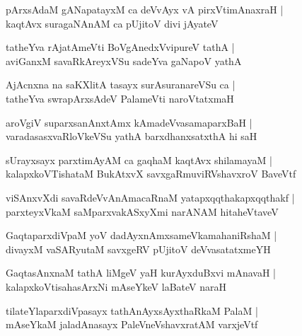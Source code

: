 \documentclass[twoside,12pt,openright]{book}
\newcounter{shloka}[chapter]
\begin{document}
\begin{shloka}%
pArxsAdaM gANapatayxM ca deVvAyx vA pirxVtimAnaxraH |\\
kaqtAvx suragaNAnAM ca pUjitoV divi jAyateV 
\end{shloka}

\begin{shloka}%
tatheYva rAjatAmeVti BoVgAnedxVvipureV tathA |\\
aviGanxM savaRkAreyxVSu sadeYva gaNapoV yathA
\end{shloka}

\begin{shloka}%
AjAcnxna na saKXlitA tasayx surAsuranareVSu ca |\\
tatheYva swrapArxsAdeV PalameVti naroVtatxmaH 
\end{shloka}

\begin{shloka}%
aroVgiV suparxsanAnxtAmx kAmadeVvasamaparxBaH |\\
varadasasxvaRloVkeVSu yathA barxdhanxsatxthA hi saH 
\end{shloka}

\begin{shloka}%
sUrayxsayx parxtimAyAM ca gaqhaM kaqtAvx shilamayaM |\\
kalapxkoVTishataM BukAtxvX savxgaRmuviRVshavxroV BaveVtf
\end{shloka}

\begin{shloka}%
viSAnxvXdi savaRdeVvAnAmacaRnaM yatapxqqthakapxqqthakf |\\
parxteyxVkaM saMparxvakASxyXmi narANAM hitaheVtaveV
\end{shloka}

\begin{shloka}%
GaqtaparxdiVpaM yoV dadAyxnAmxsameVkamahaniRshaM |\\
divayxM vaSARyutaM savxgeRV pUjitoV deVvasatatxmeYH
\end{shloka}

\begin{shloka}%
GaqtasAnxnaM tathA liMgeV yaH kurAyxduBxvi mAnavaH |\\
kalapxkoVtisahasArxNi mAseYkeV laBateV naraH 
\end{shloka}

\begin{shloka}%
tilateYlaparxdiVpasayx tathAnAyxsAyxthaRkaM PalaM |\\
mAseYkaM jaladAnasayx PaleVneVshavxratAM varxjeVtf
\end{shloka}
\end{document}
